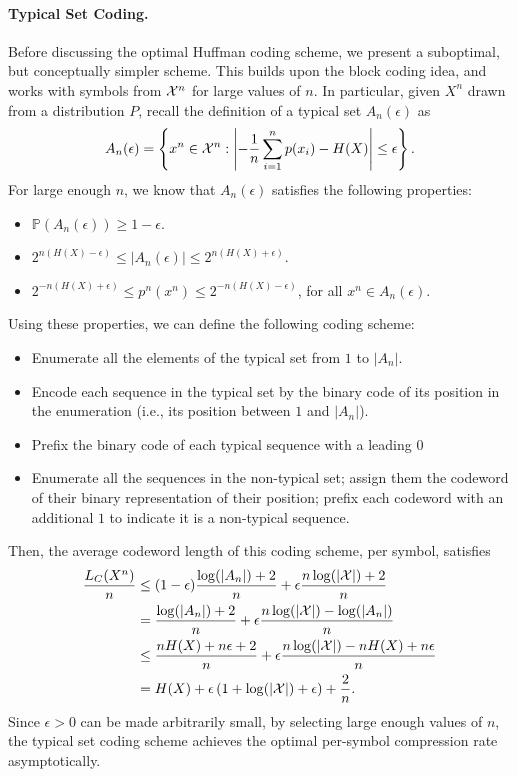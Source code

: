     \paragraph{Typical Set Coding.} Before discussing the optimal Huffman coding scheme, we present a suboptimal, but conceptually simpler scheme. This builds upon the block coding idea, and works with symbols from $\mathcal{X}^n$ for large values of $n$. In particular, given $X^n$ drawn \iid from a distribution $P$, recall the definition of a typical set $A_n(\epsilon)$ as 
    \begin{align}
        A_n(\epsilon) = \left\{ x^n \in \mathcal{X}^n: \left\lvert -\frac{1}{n} \sum_{i=1}^n p(x_i) - H(X)\right \rvert \leq \epsilon \right\}. 
    \end{align}
    For large enough $n$, we know that $A_n(\epsilon)$ satisfies the following properties: 
    \begin{itemize}
        \item $\mathbb{P}(A_n(\epsilon)) \geq 1-\epsilon$.  
        \item $2^{n(H(X)-\epsilon)} \leq |A_n(\epsilon)| \leq 2^{n(H(X) + \epsilon)}$. 
        \item $2^{-n(H(X) + \epsilon)} \leq p^n(x^n) \leq 2^{-n(H(X) - \epsilon)}$, for all $x^n \in A_n(\epsilon)$. 
    \end{itemize}
    Using these properties, we can define the following coding scheme: 
    \begin{itemize}
        \item Enumerate all the elements of the typical set from $1$ to $|A_n|$. 
        \item Encode each sequence in the typical set by the binary code of its position in the enumeration (i.e., its position between $1$ and $|A_n|$). 
        \item Prefix the binary code of each typical sequence with a leading $0$ 
        \item Enumerate all the sequences in the non-typical set; assign them the codeword of their binary representation of their position; prefix each codeword with an additional $1$ to indicate it is a non-typical sequence. 
    \end{itemize}
    Then, the average codeword length of this coding scheme, per symbol, satisfies 
    \begin{align}
        \frac{L_C(X^n)}{n} &\leq (1-\epsilon) \frac{\log(|A_n|) + 2}{n} + \epsilon \frac{n \log(|\mathcal{X}|) + 2}{n} \\
        & =   \frac{\log(|A_n|) + 2}{n} + \epsilon \frac{n \log(|\mathcal{X}|) - \log(|A_n|)}{n} \\ 
        & \leq   \frac{n H(X) + n\epsilon + 2}{n} + \epsilon \frac{n \log(|\mathcal{X}|) - nH(X) + n\epsilon}{n} \\  
        & = H(X) + \epsilon \left( 1 + \log(|\mathcal{X}|) + \epsilon\right) + \frac{2}{n}. 
    \end{align}
    Since $\epsilon > 0$ can be made arbitrarily small, by selecting large enough values of $n$, the typical set coding scheme achieves the optimal per-symbol compression rate asymptotically. 


